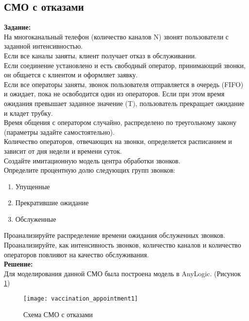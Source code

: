 \subsection*{СМО с отказами}

\textbf{Задание:}\\
На многоканальный телефон (количество каналов N) звонят пользователи с заданной интенсивностью.\\
Если все каналы заняты, клиент получает отказ в обслуживании.\\
Если соединение установлено и есть свободный оператор, принимающий звонки, он общается с клиентом и оформляет заявку.\\
Если все операторы заняты, звонок пользователя отправляется в очередь (FIFO) и ожидает, пока не освободится один из операторов. Если при этом время ожидания превышает заданное значение (T), пользователь прекращает ожидание и кладет трубку.\\
Время общения с оператором случайно, распределено по треугольному закону (параметры задайте самостоятельно).\\
Количество операторов, отвечающих на звонки, определяется расписанием и зависит от дня недели и времени суток.\\
Создайте имитационную модель центра обработки звонков.\\
Определите процентную долю следующих групп звонков:
\begin{enumerate}[topsep=0pt,itemsep=-1ex,partopsep=1ex,parsep=1ex]
	\item Упущенные
	\item Прекратившие ожидание
	\item Обслуженные
\end{enumerate}
Проанализируйте распределение времени ожидания обслуженных звонков. Проанализируйте, как интенсивность звонков, количество каналов и количество операторов повлияют на качество обслуживания.\\

\textbf{Решение:}\\
Для моделирования данной СМО была построена модель в AnyLogic. (Рисунок \ref{fig:vaccination_appointment1})
\begin{figure}[h]
	\centering \texttt{[image: vaccination\_appointment1]}
	\caption{Схема СМО с отказами}
	\label{fig:vaccination_appointment1}
\end{figure}

\newpage

